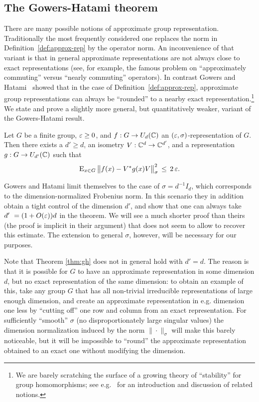 \subsection{The Gowers-Hatami theorem}

There are many possible notions of approximate group representation. Traditionally the most frequently considered one replaces the norm in Definition~\ref{def:approx-rep} by the operator norm. An inconvenience of that variant is that in general approximate representations are not always close to exact representations (see, for example, the famous problem on ``approximately commuting'' versus ``nearly commuting'' operators). In contrast 
Gowers and Hatami~\cite{gowers2017inverse} showed that in the case of Definition~\ref{def:approx-rep}, approximate group representations can always be ``rounded'' to a nearby exact representation.\footnote{We are barely scratching the surface of a growing theory of ``stability'' for group homomorphisms; see e.g.~\cite{becker2020stability} for an introduction and discussion of related notions.} 
We state and prove a slightly more general, but quantitatively weaker, variant of the Gowers-Hatami result.

\begin{theorem}\label{thm:gh}
Let $G$ be a finite group, $\varepsilon\geq 0$, and $f:G\to U_d(\mathbb{C})$ an $(\varepsilon,\sigma)$-representation of $G$. Then there exists a $d'\geq d$, an isometry $V:\mathbb{C}^d\to \mathbb{C}^{d'}$, and a representation $g:G\to U_{d'}(\mathbb{C})$ such that 
$$\textsc{E}_{x\in G}\, \big\| f(x) - V^*g(x)V \big\|_\sigma^2\, \leq\, 2\,\varepsilon.$$ 
\end{theorem}

Gowers and Hatami limit themselves to the case of $\sigma = d^{-1}I_d$, which corresponds to the dimension-normalized Frobenius norm. In this scenario they in addition obtain a tight control of the dimension $d'$, and show that one can always take $d'\ = (1+O(\varepsilon))d$ in the theorem. We will see a much shorter proof than theirs (the proof is implicit in their argument) that does not seem to allow to recover this estimate. The extension to general $\sigma$, however, will be necessary for our purposes.

Note that  Theorem \ref{thm:gh} does not in general hold  with $d'=d$. The reason is that it is possible for $G$ to have an approximate representation in some dimension $d$, but no exact representation of the same dimension: to obtain an example of this, take any group $G$ that has all non-trivial irreducible representations of large enough dimension, and create an approximate representation in e.g. dimension one less by ``cutting off'' one row and column from an exact representation. For sufficiently ``smooth'' $\sigma$ (no disproportionately large singular values) the dimension normalization induced by the norm $\|\cdot\|_\sigma$ will make this barely  noticeable, but it will be impossible to ``round'' the approximate representation obtained to an exact one without modifying the dimension. 

